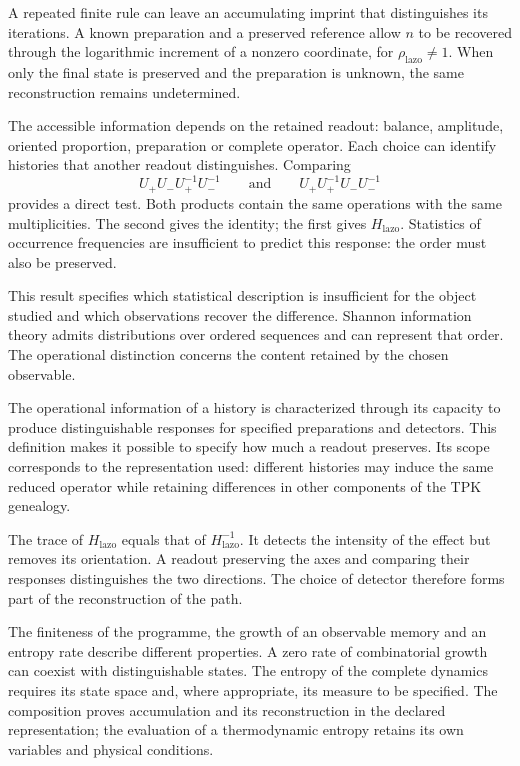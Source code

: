 A repeated finite rule can leave an accumulating imprint that
distinguishes its iterations. A known preparation and a preserved
reference allow $n$ to be recovered through the logarithmic increment
of a nonzero coordinate, for $\rho_{\mathrm{lazo}}\ne1$.
When only
the final state is preserved and the preparation is unknown, the same
reconstruction remains undetermined.

The accessible information depends on the retained readout: balance,
amplitude, oriented proportion, preparation or complete operator. Each
choice can identify histories that another readout distinguishes.
Comparing
\begin{equation}
 U_+U_-U_+^{-1}U_-^{-1}
 \qquad\text{and}\qquad
 U_+U_+^{-1}U_-U_-^{-1}
 \label{eq:narrativa-orden-multiplicidades}
\end{equation}
provides a direct test. Both products contain the same
operations with the same multiplicities. The second gives the identity;
the first gives $H_{\mathrm{lazo}}$. Statistics of occurrence
frequencies are insufficient to predict this response: the order
must also be preserved.

This result specifies which statistical description is insufficient
for the object studied and which observations recover the difference.
Shannon information theory admits distributions over
ordered sequences and can represent that order. The operational
distinction concerns the content retained by the chosen observable.

The operational information of a history is characterized through
its capacity to produce distinguishable responses for specified preparations
and detectors. This definition makes it possible to specify how much
a readout preserves. Its scope corresponds to the representation
used: different histories may induce the same reduced
operator while retaining differences in other components of the TPK
genealogy.

The trace of $H_{\mathrm{lazo}}$ equals that of
$H_{\mathrm{lazo}}^{-1}$. It detects the intensity of the effect but removes
its orientation. A readout preserving the axes and comparing their
responses distinguishes the two directions. The choice of detector therefore
forms part of the reconstruction of the path.

The finiteness of the programme, the growth of an observable memory and
an entropy rate describe different properties. A zero rate of
combinatorial growth can coexist with distinguishable states.
The entropy of the complete dynamics requires its state space
and, where appropriate, its measure to be specified. The composition proves
accumulation and its reconstruction in the declared representation;
the evaluation of a thermodynamic entropy retains its own variables
and physical conditions.


